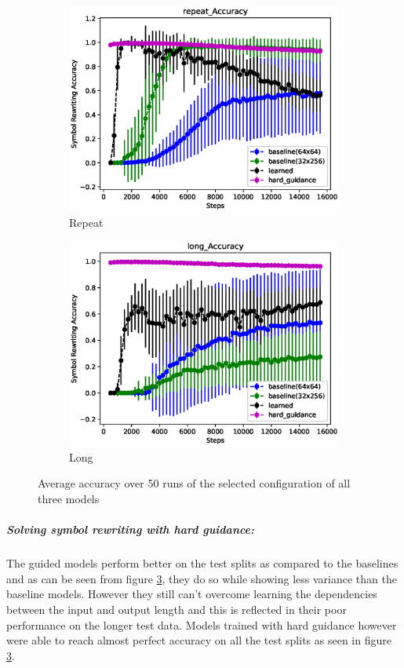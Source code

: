 \begin{figure}[H]
\begin{subfigure}{0.5\linewidth}
		\includegraphics[width=0.95\linewidth]{./figs/sr/repeat-acc-eps}
		\caption{Repeat}\label{repeat-acc}
	\end{subfigure}
	\begin{subfigure}{0.5\linewidth}
		\includegraphics[width=0.95\linewidth]{./figs/sr/long-acc-eps}
		\caption{Long}\label{long-acc}
	\end{subfigure}
	\caption{Average accuracy over 50 runs of the selected configuration of all three models}\label{sr-all-acc}
\end{figure}

\subparagraph{Solving symbol rewriting with hard guidance:} The guided models perform better on the test splits as compared to the baselines and as can be seen from figure \ref{sr-all-acc}, they do so while showing less variance than the baseline models. However they still can't overcome learning the dependencies between the input and output length and this is reflected in their poor performance on the longer test data. Models trained with hard guidance however were able to reach almost perfect accuracy on all the test splits as seen in figure \ref{sr-all-acc}.

